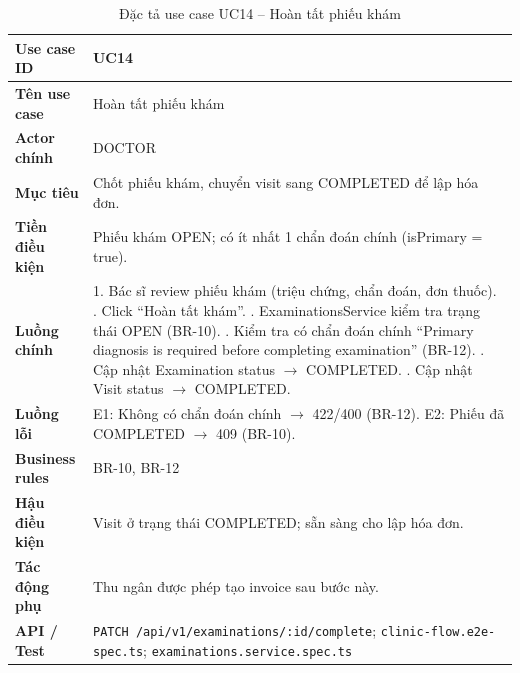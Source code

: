 \begin{table}[H]
\centering
\caption{Đặc tả use case UC14 -- Hoàn tất phiếu khám}
\label{tab:uc14}
\begin{tabularx}{\textwidth}{|p{3.6cm}|X|}
\hline
\textbf{Use case ID} & UC14 \\
\hline
\textbf{Tên use case} & Hoàn tất phiếu khám \\
\hline
\textbf{Actor chính} & DOCTOR \\
\hline
\textbf{Mục tiêu} & Chốt phiếu khám, chuyển visit sang COMPLETED để lập hóa đơn. \\
\hline
\textbf{Tiền điều kiện} & Phiếu khám OPEN; có ít nhất 1 chẩn đoán chính (isPrimary = true). \\
\hline
\textbf{Luồng chính} &
1. Bác sĩ review phiếu khám (triệu chứng, chẩn đoán, đơn thuốc). \newline
2. Click ``Hoàn tất khám''. \newline
3. ExaminationsService kiểm tra trạng thái OPEN (BR-10). \newline
4. Kiểm tra có chẩn đoán chính ``Primary diagnosis is required before completing examination'' (BR-12). \newline
5. Cập nhật Examination status $\rightarrow$ COMPLETED. \newline
6. Cập nhật Visit status $\rightarrow$ COMPLETED. \\
\hline
\textbf{Luồng lỗi} & E1: Không có chẩn đoán chính $\rightarrow$ 422/400 (BR-12). E2: Phiếu đã COMPLETED $\rightarrow$ 409 (BR-10). \\
\hline
\textbf{Business rules} & BR-10, BR-12 \\
\hline
\textbf{Hậu điều kiện} & Visit ở trạng thái COMPLETED; sẵn sàng cho lập hóa đơn. \\
\hline
\textbf{Tác động phụ} & Thu ngân được phép tạo invoice sau bước này. \\
\hline
\textbf{API / Test} & \texttt{PATCH /api/v1/examinations/:id/complete}; \texttt{clinic-flow.e2e-spec.ts}; \texttt{examinations.service.spec.ts} \\
\hline
\end{tabularx}
\end{table}

